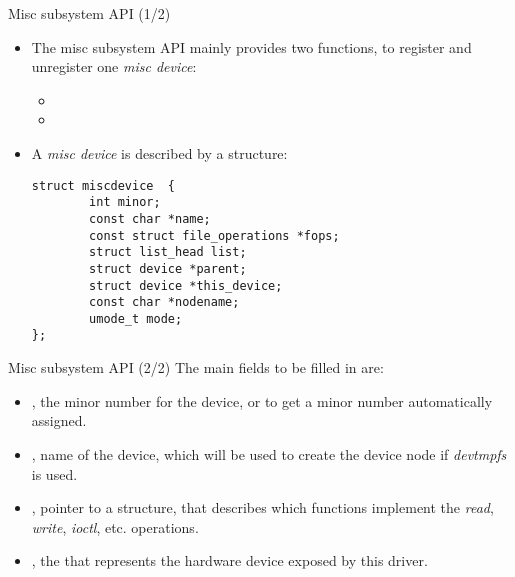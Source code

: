 \begin{frame}[fragile]{Misc subsystem API (1/2)}
  \begin{itemize}
  \item The misc subsystem API mainly provides two functions, to
    register and unregister one {\em misc device}:
    \begin{itemize}
    \item {}
    \item {}
    \end{itemize}
  \item A {\em misc device} is described by a 
    structure:
    \begin{verbatim}
struct miscdevice  {
        int minor;
        const char *name;
        const struct file_operations *fops;
        struct list_head list;
        struct device *parent;
        struct device *this_device;
        const char *nodename;
        umode_t mode;
};
\end{verbatim}
  \end{itemize}
\end{frame}

\begin{frame}[fragile]{Misc subsystem API (2/2)}
  The main fields to be filled in  are:
  \begin{itemize}
  \item {}, the minor number for the device, or
     to get a minor number automatically
    assigned.
  \item {}, name of the device, which will be used to create
    the device node if {\em devtmpfs} is used.
  \item {}, pointer to a  structure, that
    describes which functions implement the {\em read}, {\em write},
    {\em ioctl}, etc. operations.
  \item {}, the  that represents the
    hardware device exposed by this driver.
  \end{itemize}
\end{frame}

